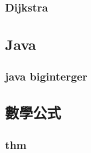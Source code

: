     \subsection{Dijkstra}
        

\section{Java}
    \subsection{java biginterger}
        

\section{數學公式}
    \subsection{thm}
        
        
